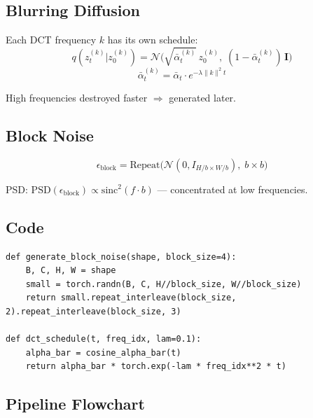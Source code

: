 \documentclass[11pt, a4paper]{article}
\newcommand{\alphabar}{\bar{\alpha}}
\begin{document}
\subsection{Blurring Diffusion}

Each DCT frequency $k$ has its own schedule:
\begin{equation}
    q(z_t^{(k)} | z_0^{(k)}) = \mathcal{N}\bigl(\sqrt{\alphabar_t^{(k)}}\, z_0^{(k)},\; (1-\alphabar_t^{(k)})\,\mathbf{I}\bigr)
\end{equation}
\begin{equation}
    \alphabar_t^{(k)} = \alphabar_t \cdot e^{-\lambda \|k\|^2 t}
\end{equation}

High frequencies destroyed faster $\Rightarrow$ generated later.

\subsection{Block Noise}

\begin{equation}
    \epsilon_{\mathrm{block}} = \mathrm{Repeat}\bigl(\mathcal{N}(0, I_{H/b \times W/b}),\; b \times b\bigr)
\end{equation}

PSD: $\mathrm{PSD}(\epsilon_{\mathrm{block}}) \propto \mathrm{sinc}^2(f \cdot b)$ --- concentrated at low frequencies.

\subsection{Code}

\begin{lstlisting}[caption={Relay: Block Noise and DCT Schedule}]
def generate_block_noise(shape, block_size=4):
    B, C, H, W = shape
    small = torch.randn(B, C, H//block_size, W//block_size)
    return small.repeat_interleave(block_size, 2).repeat_interleave(block_size, 3)

def dct_schedule(t, freq_idx, lam=0.1):
    alpha_bar = cosine_alpha_bar(t)
    return alpha_bar * torch.exp(-lam * freq_idx**2 * t)
\end{lstlisting}

\subsection{Pipeline Flowchart}
\end{document}
